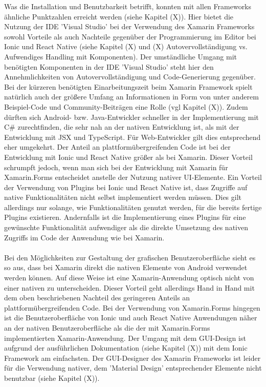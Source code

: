 Was die Installation und Benutzbarkeit betrifft, konnten mit allen Frameworks ähnliche Punktzahlen erreicht werden (siehe Kapitel (X)). Hier bietet die Nutzung der IDE 'Visual Studio' bei der Verwendung des Xamarin Frameworks sowohl Vorteile als auch Nachteile gegenüber der Programmierung im Editor bei Ionic und React Native (siehe Kapitel (X) und (X) Autovervollständigung vs. Aufwendiges Handling mit Komponenten). Der umständliche Umgang mit benötigten Komponenten in der IDE 'Visual Studio' steht hier den Annehmlichkeiten von Autovervollständigung und Code-Generierung gegenüber. Bei der kürzeren benötigten Einarbeitungszeit beim Xamarin Framework spielt natürlich auch der größere Umfang an Informationen in Form von unter anderem Beispiel-Code und Community-Beiträgen eine Rolle (vgl Kapitel (X)). Zudem dürften sich Android- bzw. Java-Entwickler schneller in der Implementierung mit C\# zurechtfinden, die sehr nah an der nativen Entwicklung ist, als mit der Entwicklung mit JSX und TypeScript. Für Web-Entwickler gilt dies entsprechend eher umgekehrt. Der Anteil an plattformübergreifenden Code ist bei der Entwicklung mit Ionic und React Native größer als bei Xamarin. Dieser Vorteil schrumpft jedoch, wenn man sich bei der Entwicklung mit Xamarin für Xamarin.Forms entscheidet anstelle der Nutzung nativer UI-Elemente. Ein Vorteil der Verwendung von Plugins bei Ionic und React Native ist, dass Zugriffe auf native Funktionalitäten nicht selbst implementiert werden müssen. Dies gilt allerdings nur solange, wie Funktionalitäten genutzt werden, für die bereits fertige Plugins existieren. Andernfalls ist die Implementierung eines Plugins für eine gewünschte Funktionalität aufwendiger als die direkte Umsetzung des nativen Zugriffs im Code der Anwendung wie bei Xamarin. 
\\
\\
Bei den Möglichkeiten zur Gestaltung der grafischen Benutzeroberfläche sieht es so aus, dass bei Xamarin direkt die nativen Elemente von Android verwendet werden können. Auf diese Weise ist eine Xamarin-Anwendung optisch nicht von einer nativen zu unterscheiden. Dieser Vorteil geht allerdings Hand in Hand mit dem oben beschriebenen Nachteil des geringeren Anteils an plattformübergreifenden Code. Bei der Verwendung von Xamarin.Forms hingegen ist die Benutzeroberfläche von Ionic und auch React Native Anwendungen näher an der nativen Benutzeroberfläche als die der mit Xamarin.Forms implementierten Xamarin-Anwendung. Der Umgang mit dem GUI-Design ist aufgrund der ausführlichen Dokumentation (siehe Kapitel (X)) mit dem Ionic Framework am einfachsten. Der GUI-Designer des Xamarin Frameworks ist leider für die Verwendung nativer, dem 'Material Design' entsprechender Elemente nicht benutzbar (siehe Kapitel (X)). 
